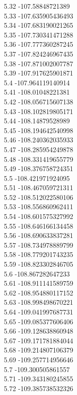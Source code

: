 {5.32	-107.58848721389\\
5.33	-107.635905436493\\
5.34	-107.683190021265\\
5.35	-107.730341471288\\
5.36	-107.777360287245\\
5.37	-107.824246967435\\
5.38	-107.871002007787\\
5.39	-107.917625901871\\
5.4	-107.964119140914\\
5.41	-108.01048221381\\
5.42	-108.056715607138\\
5.43	-108.102819805171\\
5.44	-108.14879528989\\
5.45	-108.194642540998\\
5.46	-108.240362035933\\
5.47	-108.285954249878\\
5.48	-108.331419655779\\
5.49	-108.376758724351\\
5.5	-108.421971924095\\
5.51	-108.467059721311\\
5.52	-108.512022580106\\
5.53	-108.556860962411\\
5.54	-108.601575327992\\
5.55	-108.646166134458\\
5.56	-108.690633837281\\
5.57	-108.734978889799\\
5.58	-108.779201743235\\
5.59	-108.823302846705\\
5.6	-108.867282647233\\
5.61	-108.911141589759\\
5.62	-108.954880117152\\
5.63	-108.998498670221\\
5.64	-109.041997687731\\
5.65	-109.085377606406\\
5.66	-109.128638860948\\
5.67	-109.171781884044\\
5.68	-109.214807106379\\
5.69	-109.257714956646\\
5.7	-109.300505861557\\
5.71	-109.343180245855\\
5.72	-109.385738532326\\
}
